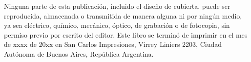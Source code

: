 \vfill

\noindent {}\bigskip

\noindent Ninguna parte de esta publicación, incluido el diseño de cubierta, puede ser reproducida, almacenada o transmitida de manera alguna ni por ningún medio, ya sea eléctrico, químico, mecánico, óptico, de grabación o de fotocopia, sin permiso previo por escrito del editor. Este libro se terminó de imprimir en el mes de xxxx de 20xx en San Carlos Impresiones, Virrey Liniers 2203, Ciudad Autónoma de Buenos Aires, República Argentina.